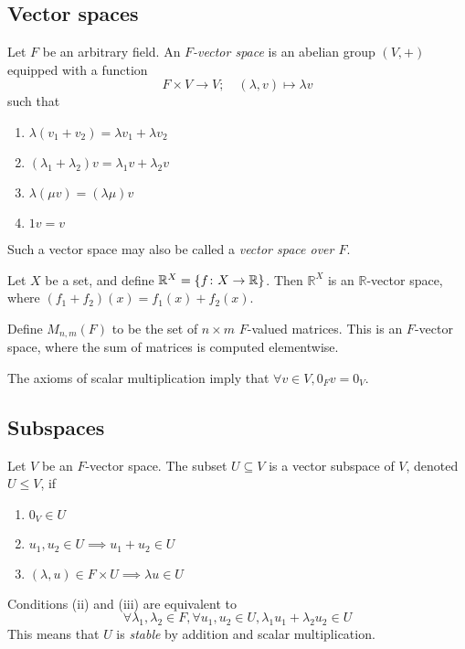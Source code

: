 \subsection{Vector spaces}
\begin{definition}
	Let \( F \) be an arbitrary field.
	An \textit{\( F \)-vector space} is an abelian group \( (V, +) \) equipped with a function
	\[
		F \times V \to V;\quad (\lambda, v) \mapsto \lambda v
	\]
	such that
	\begin{enumerate}
		\item \( \lambda(v_1 + v_2) = \lambda v_1 + \lambda v_2 \)
		\item \( (\lambda_1 + \lambda_2) v = \lambda_1 v + \lambda_2 v \)
		\item \( \lambda ( \mu v ) = ( \lambda \mu ) v \)
		\item \( 1 v = v \)
	\end{enumerate}
	Such a vector space may also be called a \textit{vector space over \( F \)}.
\end{definition}

\begin{example}
	Let \( X \) be a set, and define \( \mathbb R^X = \qty{ f \colon X \to \mathbb R} \).
	Then \( \mathbb R^X \) is an \( \mathbb R \)-vector space, where \( (f_1 + f_2)(x) = f_1(x) + f_2(x) \).
\end{example}

\begin{example}
	Define \( M_{n,m}(F) \) to be the set of \( n \times m \) \( F \)-valued matrices.
	This is an \( F \)-vector space, where the sum of matrices is computed elementwise.
\end{example}

\begin{remark}
	The axioms of scalar multiplication imply that \( \forall v \in V, 0_F v = 0_V \).
\end{remark}

\subsection{Subspaces}
\begin{definition}
	Let \( V \) be an \( F \)-vector space.
	The subset \( U \subseteq V \) is a vector subspace of \( V \), denoted \( U \leq V \), if
	\begin{enumerate}
		\item \( 0_V \in U \)
		\item \( u_1, u_2 \in U \implies u_1 + u_2 \in U \)
		\item \( (\lambda, u) \in F \times U \implies \lambda u \in U \)
	\end{enumerate}
	Conditions (ii) and (iii) are equivalent to
	\[
		\forall \lambda_1, \lambda_2 \in F, \forall u_1, u_2 \in U, \lambda_1 u_1 + \lambda_2 u_2 \in U
	\]
	This means that \( U \) is \textit{stable} by addition and scalar multiplication.
\end{definition}

